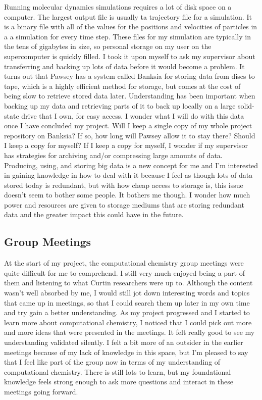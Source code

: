 \documentclass[11pt]{article}
\begin{document}
Running molecular dynamics simulations requires a lot of disk space on a computer. The largest output file is usually ta trajectory file for a simulation. It is a binary file with all of the values for the positions and velocities of particles in a a simulation for every time step. These files for my simulation are typically in the tens of gigabytes in size, so personal storage on my user on the supercomputer is quickly filled. I took it upon myself to ask my supervisor about transferring and backing up lots of data before it would become a problem. It turns out that Pawsey has a system called Banksia for storing data from discs to tape, which is a highly efficient method for storage, but comes at the cost of being slow to retrieve stored data later. Understanding has been important when backing up my data and retrieving parts of it to back up locally on a large solid-state drive that I own, for easy access. I wonder what I will do with this data once I have concluded my project. Will I keep a single copy of my whole project repository on Banksia? If so, how long will Pawsey allow it to stay there? Should I keep a copy for myself? If I keep a copy for myself, I wonder if my supervisor has strategies for archiving and/or compressing large amounts of data. Producing, using, and storing big data is a new concept for me and I'm interested in gaining knowledge in how to deal with it because I feel as though lots of data stored today is redundant, but with how cheap access to storage is, this issue doesn't seem to bother some people. It bothers me though. I wonder how much power and resources are given to storage mediums that are storing redundant data and the greater impact this could have in the future.

\subsection{Group Meetings}

At the start of my project, the computational chemistry group meetings were quite difficult for me to comprehend. I still very much enjoyed being a part of them and listening to what Curtin researchers were up to. Although the content wasn't well absorbed by me, I would still jot down interesting words and topics that came up in meetings, so that I could search them up later in my own time and try gain a better understanding. As my project progressed and I started to learn more about computational chemistry, I noticed that I could pick out more and more ideas that were presented in the meetings. It felt really good to see my understanding validated silently. I felt a bit more of an outsider in the earlier meetings because of my lack of knowledge in this space, but I'm pleased to say that I feel like part of the group now in terms of my understanding of computational chemistry. There is still lots to learn, but my foundational knowledge feels strong enough to ask more questions and interact in these meetings going forward.
\end{document}
